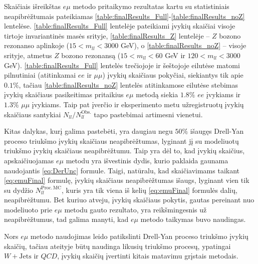 \documentclass[a4paper, 12pt]{article}
\newcommand{\emu}{e\mu}
\newcommand{\mumu}{\mu\mu}
\newcommand{\WJets}{W\! +\!\mathrm{Jets}}
\newcommand{\QCD}{QC\! D}
\newlength\q
\begin{document}
Skaičiais išreikštas $\emu$ metodo pritaikymo rezultatas kartu su statistiniais neapibrėžtumais pateikiamas
\ref{table:finalResults_Full}-\ref{table:finalResults_noZ} lentelėse. \ref{table:finalResults_Full} lentelėje pateikiami įvykių
skaičiai visoje tirtoje invariantinės masės srityje, \ref{table:finalResults_Z} lentelėje -- $Z$ bozono rezonanso aplinkoje
($15<m_{ll}<3000$ GeV), o \ref{table:finalResults_noZ} -- visoje srityje, atmetus $Z$ bozono rezonansą ($15<m_{ll}<60$ GeV ir
$120<m_{ll}<3000$ GeV).
\ref{table:finalResults_Full} lentelės trečiojoje ir šeštojoje eilutėse matomi pilnutiniai (atitinkamai $ee$ ir $\mumu$) įvykių
skaičiaus pokyčiai, siekiantys tik apie $0.1\%$, tačiau \ref{table:finalResults_noZ} lentelės atitinkamose eilutėse stebimas
įvykių skaičiaus pasikeitimas pritaikius $\emu$ metodą siekia $1.8\%$ $ee$ įvykiams ir $1.3\%$ $\mumu$ įvykiams.
Taip pat įverčio ir eksperimento metu užregistruotų įvykių skaičiaus santykiai $N_{ll}/N_{ll}^{\mathrm{Obs.}}$ tapo pastebimai
artimesni vienetui.

Kitas dalykas, kurį galima pastebėti, yra daugiau negu $50\%$ išaugęs Drell-Yan proceso triukšmo įvykių skaičiaus neapibrėžtumas,
lyginant jį su modeliuotų triukšmo įvykių skaičiaus neapibrėžtumu.
Taip yra dėl to, kad įvykių skaičius, apskaičiuojamas $\emu$ metodu yra išvestinis dydis, kurio paklaida gaunama naudojantis
\eqref{eq:DerUnc} formule.
Taigi, natūralu, kad skaičiavimams taikant \eqref{eq:emuFinal} formulę, įvykių skaičiaus neapibrėžtumas išaugs, lyginant vien tik
su dydžio $N_{ll}^{\mathrm{Proc. \, MC}}$, kuris yra tik viena iš kelių \eqref{eq:emuFinal} formulės dalių, neapibrėžtumu.
Bet kuriuo atveju, įvykių skaičiaus pokytis, gautas pereinant nuo modeliuoto prie $\emu$ metodu gauto rezultato, yra reikšmingesnis
už neapibrėžtumus, tad galima manyti, kad $\emu$ metodo taikymas buvo naudingas.

Nors $\emu$ metodo naudojimas leido patikslinti Drell-Yan proceso triukšmo įvykių skaičių, tačiau ateityje būtų
naudinga likusių triukšmo procesų, ypatingai $\WJets$ ir $\QCD$, įvykių skaičių įvertinti kitais matavimu grįstais
metodais.
\end{document}
